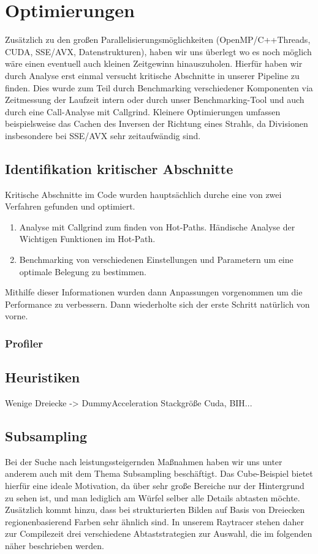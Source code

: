 \section{Optimierungen}
Zusätzlich zu den großen Parallelisierungsmöglichkeiten (OpenMP/C++Threads, CUDA, SSE/AVX, Datenstrukturen), haben wir uns überlegt wo es noch möglich wäre einen eventuell auch kleinen Zeitgewinn hinauszuholen.
Hierfür haben wir durch Analyse erst einmal versucht kritische Abschnitte in unserer Pipeline zu finden.
Dies wurde zum Teil durch Benchmarking verschiedener Komponenten via Zeitmessung der Laufzeit intern oder durch unser Benchmarking-Tool und auch durch eine Call-Analyse mit Callgrind.
Kleinere Optimierungen umfassen beispielsweise das Cachen des Inversen der Richtung eines Strahls, da Divisionen insbesondere bei SSE/AVX sehr zeitaufwändig sind.

\subsection{Identifikation kritischer Abschnitte}
Kritische Abschnitte im Code wurden hauptsächlich durche eine von zwei Verfahren gefunden und optimiert.
\begin{enumerate}
	\item Analyse mit Callgrind zum finden von Hot-Paths. Händische Analyse der Wichtigen Funktionen im Hot-Path.
	\item Benchmarking von verschiedenen Einstellungen und Parametern um eine optimale Belegung zu bestimmen.
\end{enumerate}
Mithilfe dieser Informationen wurden dann Anpassungen vorgenommen um die Performance zu verbessern.
Dann wiederholte sich der erste Schritt natürlich von vorne.
\subsubsection{Profiler}

\subsection{Heuristiken}
Wenige Dreiecke -> DummyAcceleration
Stackgröße Cuda, BIH...

\subsection{Subsampling}
Bei der Suche nach leistungssteigernden Maßnahmen haben wir uns unter anderem auch mit dem Thema Subsampling beschäftigt.
Das Cube-Beispiel bietet hierfür eine ideale Motivation, da über sehr große Bereiche nur der Hintergrund zu sehen ist, und man lediglich am Würfel selber alle Details abtasten möchte.
Zusätzlich kommt hinzu, dass bei strukturierten Bilden auf Basis von Dreiecken regionenbasierend Farben sehr ähnlich sind.
In unserem Raytracer stehen daher zur Compilezeit drei verschiedene Abtaststrategien zur Auswahl, die im folgenden näher beschrieben werden.

